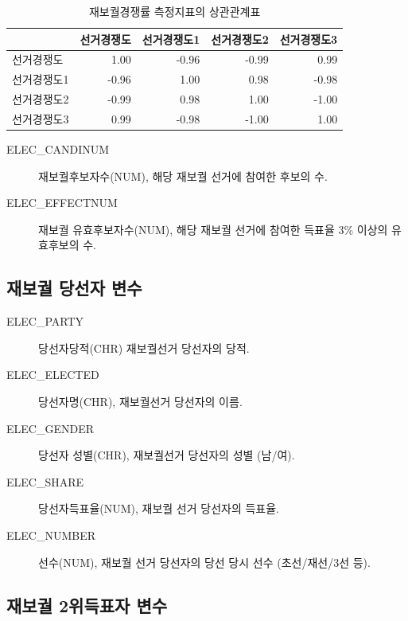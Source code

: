 \documentclass[
  11pt,
  letter]{article}
\begin{document}
\begin{longtable}[t]{l|r|r|r|r}
\caption{\label{tab:unnamed-chunk-10}재보궐경쟁률 측정지표의 상관관계표}\\
\hline
  & 선거경쟁도 & 선거경쟁도1 & 선거경쟁도2 & 선거경쟁도3\\
\hline
선거경쟁도 & 1.00 & -0.96 & -0.99 & 0.99\\
\hline
선거경쟁도1 & -0.96 & 1.00 & 0.98 & -0.98\\
\hline
선거경쟁도2 & -0.99 & 0.98 & 1.00 & -1.00\\
\hline
선거경쟁도3 & 0.99 & -0.98 & -1.00 & 1.00\\
\hline
\end{longtable}

\begin{description}
\item[ELEC\_CANDINUM]
재보궐후보자수(NUM), 해당 재보궐 선거에 참여한 후보의 수.
\item[ELEC\_EFFECTNUM]
재보궐 유효후보자수(NUM), 해당 재보궐 선거에 참여한 득표율 3\% 이상의
유효후보의 수.
\end{description}

\newpage

\hypertarget{uxc7acuxbcf4uxad90-uxb2f9uxc120uxc790-uxbcc0uxc218}{%
\subsection{재보궐 당선자
변수}\label{uxc7acuxbcf4uxad90-uxb2f9uxc120uxc790-uxbcc0uxc218}}

\begin{description}
\item[ELEC\_PARTY]
당선자당적(CHR) 재보궐선거 당선자의 당적.
\item[ELEC\_ELECTED]
당선자명(CHR), 재보궐선거 당선자의 이름.
\item[ELEC\_GENDER]
당선자 성별(CHR), 재보궐선거 당선자의 성별 (남/여).
\item[ELEC\_SHARE]
당선자득표율(NUM), 재보궐 선거 당선자의 득표율.
\item[ELEC\_NUMBER]
선수(NUM), 재보궐 선거 당선자의 당선 당시 선수 (초선/재선/3선 등).
\end{description}

\hypertarget{uxc7acuxbcf4uxad90-2uxc704uxb4dduxd45cuxc790-uxbcc0uxc218}{%
\subsection{재보궐 2위득표자
변수}\label{uxc7acuxbcf4uxad90-2uxc704uxb4dduxd45cuxc790-uxbcc0uxc218}}
\end{document}
